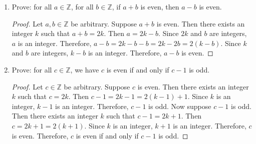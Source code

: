 \documentclass{article}
\newcommand\Z{\mathbb{Z}}
\begin{document}
\begin{enumerate}
      \begin{proof}
            Suppose that the Minesweeper configuration is as given in Figure 3.2. We will consider three cases based on the contents of cells P, Q, and R. 
            \begin{itemize}
                \item Case 1: If cells P, Q, and R are all safe, then since cell V has three mines adjacent to it, cell V must be a mine.
                \item Case 2: If cell P is a mine, then cell V must be a mine since it has three mines adjacent to it.
                \item Case 3: If cell Q is a mine, then cell V must be a mine since it has three mines adjacent to it.
            \end{itemize}
            Therefore, in all cases, if the Minesweeper configuration is as given in Figure 3.2, then Cell V is a mine.
      \end{proof}

    \newpage

    \item Prove: for all $a \in \mathbb{Z}$, for all $b \in \mathbb{Z}$, if $a+b$ is
          even, then $a-b$ is even.

      \begin{proof}
              Let $a, b \in \Z$ be arbitrary. Suppose $a+b$ is even. Then there exists an integer $k$ such that $a+b = 2k$. Then $a = 2k - b$. Since $2k$ and $b$ are integers, $a$ is an integer. Therefore, $a-b = 2k - b - b = 2k - 2b = 2(k-b)$. Since $k$ and $b$ are integers, $k-b$ is an integer. Therefore, $a-b$ is even.
      \end{proof}

    \newpage

    \item Prove: for all $c \in \mathbb{Z}$, we have $c$ is even if and only if $c-1$ is
          odd.

      \begin{proof}
              Let $c \in \Z$ be arbitrary. Suppose $c$ is even. Then there exists an integer $k$ such that $c = 2k$. Then $c-1 = 2k - 1 = 2(k-1) + 1$. Since $k$ is an integer, $k-1$ is an integer. Therefore, $c-1$ is odd. Now suppose $c-1$ is odd. Then there exists an integer $k$ such that $c-1 = 2k + 1$. Then $c = 2k + 1 = 2(k+1)$. Since $k$ is an integer, $k+1$ is an integer. Therefore, $c$ is even. Therefore, $c$ is even if and only if $c-1$ is odd.
      \end{proof}


\end{enumerate}
\end{document}

